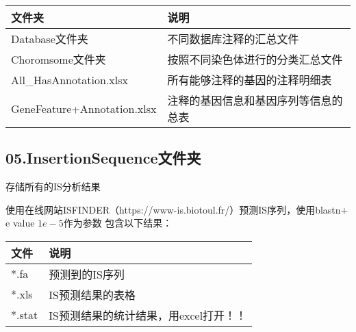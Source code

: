 \begin{table}[H]
        \begin{center}
            \begin{threeparttable}
                \begin{tabularx}{\textwidth}{XX}

                    \toprule
                    \bfseries{文件夹}                  &\bfseries{说明}\\
                    \midrule
                    Database文件夹                                                   &不同数据库注释的汇总文件\\
                    Choromsome文件夹                                              &按照不同染色体进行的分类汇总文件\\
                    All\_HasAnnotation.xlsx           &所有能够注释的基因的注释明细表\\

                    GeneFeature+Annotation.xlsx        &注释的基因信息和基因序列等信息的总表\\
                    \bottomrule

                \end{tabularx}

            \end{threeparttable}
        \end{center}
\end{table}

\subsection{05.InsertionSequence文件夹}
存储所有的IS分析结果

使用在线网站ISFINDER（https://www-is.biotoul.fr/）预测IS序列，使用blastn$+$e value $1e-5$作为参数
包含以下结果：
\begin{table}[H]
        \begin{center}
            \begin{threeparttable}
                \begin{tabularx}{\textwidth}{XX}

                    \toprule
                    \bfseries{文件}                  &\bfseries{说明}\\
                    \midrule
                    *.fa                            &预测到的IS序列\\
                    
                    *.xls                            &IS预测结果的表格\\
                    *.stat                          &IS预测结果的统计结果，用excel打开！！\\
                    \bottomrule

                \end{tabularx}

            \end{threeparttable}
        \end{center}
\end{table}

